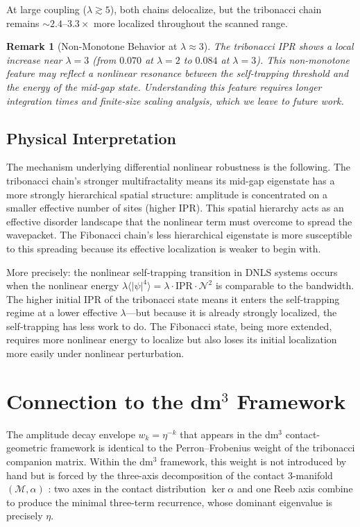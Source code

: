 \documentclass[12pt,a4paper]{article}
\newtheorem{remark}{Remark}
\begin{document}
At large coupling ($\lambda \gtrsim 5$), both chains delocalize, but the
tribonacci chain remains $\sim 2.4$--$3.3\times$ more localized throughout
the scanned range.

\begin{remark}[Non-Monotone Behavior at $\lambda \approx 3$]
The tribonacci IPR shows a local increase near $\lambda = 3$ (from $0.070$
at $\lambda = 2$ to $0.084$ at $\lambda = 3$). This non-monotone feature may
reflect a nonlinear resonance between the self-trapping threshold and the
energy of the mid-gap state. Understanding this feature requires longer
integration times and finite-size scaling analysis, which we leave to future
work.
\end{remark}

\subsection{Physical Interpretation}

The mechanism underlying differential nonlinear robustness is the following.
The tribonacci chain's stronger multifractality means its mid-gap eigenstate
has a more strongly hierarchical spatial structure: amplitude is concentrated
on a smaller effective number of sites (higher IPR). This spatial hierarchy
acts as an effective disorder landscape that the nonlinear term must overcome
to spread the wavepacket. The Fibonacci chain's less hierarchical eigenstate
is more susceptible to this spreading because its effective localization is
weaker to begin with.

More precisely: the nonlinear self-trapping transition in DNLS systems occurs
when the nonlinear energy $\lambda \langle |\psi|^4 \rangle = \lambda \cdot
\mathrm{IPR} \cdot \mathcal{N}^2$ is comparable to the bandwidth. The higher
initial IPR of the tribonacci state means it enters the self-trapping regime
at a lower effective $\lambda$---but because it is already strongly localized,
the self-trapping has less work to do. The Fibonacci state, being more
extended, requires more nonlinear energy to localize but also loses its initial
localization more easily under nonlinear perturbation.

\section{Connection to the dm$^3$ Framework}

The amplitude decay envelope $w_k = \eta^{-k}$ that appears in the dm$^3$
contact-geometric framework \cite{Grossi2026_Vol1,Grossi2026_Wavenumber6}
is identical to the Perron--Frobenius weight of the tribonacci companion
matrix. Within the dm$^3$ framework, this weight is not introduced by hand
but is forced by the three-axis decomposition of the contact 3-manifold
$(\mathcal{M}, \alpha)$ \cite{Grossi2026_Vol1,Grossi2026_Tribonacci}: two
axes in the contact distribution $\ker\alpha$ and one Reeb axis combine to
produce the minimal three-term recurrence, whose dominant eigenvalue is
precisely $\eta$.
\end{document}
